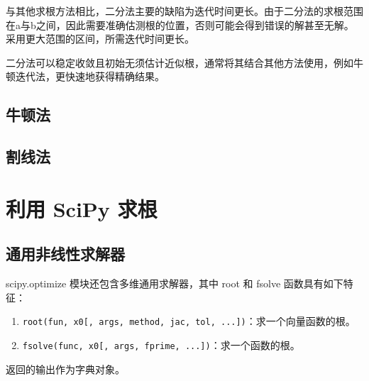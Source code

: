 与其他求根方法相比，二分法主要的缺陷为迭代时间更长。由于二分法的求根范围在a与b之间，因此需要准确估测根的位置，否则可能会得到错误的解甚至无解。采用更大范围的区间，所需迭代时间更长。

二分法可以稳定收敛且初始无须估计近似根，通常将其结合其他方法使用，例如牛顿迭代法，更快速地获得精确结果。
\subsection{牛顿法}
\subsection{割线法}
\section{利用 SciPy 求根}
\subsection{通用非线性求解器}
scipy.optimize 模块还包含多维通用求解器，其中 root 和 fsolve 函数具有如下特征：
\begin{enumerate}
    \item \verb|root(fun, x0[, args, method, jac, tol, ...])|：求一个向量函数的根。
    \item \verb|fsolve(func, x0[, args, fprime, ...])|：求一个函数的根。
\end{enumerate}
返回的输出作为字典对象。